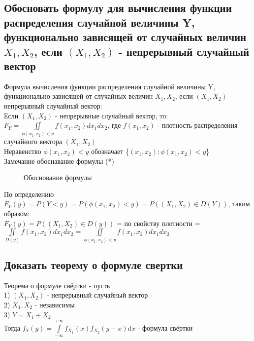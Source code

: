 \subsection{Обосновать формулу для вычисления функции распределения случайной величины Y, функционально зависящей от случайных величин $X_{1}, X_{2}$, если $(X_{1}, X_{2})$ - непрерывный случайный вектор}
Формула вычисления функции распределения случайной величины Y, функционально зависящей от случайных величин $X_{1}, X_{2}$, если $(X_{1}, X_{2})$ - непрерывный случайный вектор:\\
Если $(X_{1}, X_{2})$ - непрерывные случайный вектор, то:\\
$F_{Y} = \iint\limits_{\phi(x_{1}, x_{2}) < y} f(x_{1}, x_{2}) dx_{1} dx_{2}$, где $f(x_{1}, x_{2})$ - плотность распределения случайного вектора $(X_{1}, X_{2})$\\
Неравенство $\phi(x_{1}, x_{2}) < y$ обозначает \{$(x_{1}, x_{2}) : \phi(x_{1}, x_{2}) < y$\}\\

Замечание обоснавание формулы (*)\\
\begin{figure}[H]
	\caption{Обоснование формулы}
\end{figure}

По определению $F_{Y}(y) = P(Y < y) = P(\phi(x_{1}, x_{2}) < y) = P((X_{1}, X_{2}) \in D(Y))$, таким образом:\\
$F_{Y}(y) = P((X_{1}, X_{2}) \in D(y))$ = по свойству плотности = $\iint\limits_{D(y)} f(x_{1}, x_{2}) dx_{1} dx_{2} = \iint\limits_{\phi(x_{1}, x_{2}) < y}f(x_{1}, x_{2}) dx_{1} dx_{2}$\\

\subsection{Доказать теорему о формуле свертки}
Теорема о формуле свёртки - пусть\\
1) $(X_{1}, X_{2})$ - непрерывный случайный вектор\\
2) $X_{1}, X_{2}$ - независимы\\
3) $Y = X_{1} + X_{2}$\\

Тогда $f_{Y}(y) = \int\limits_{-\infty}^{+\infty} f_{X_{1}}(x) f_{X_2}(y - x) dx$ - формула свёртки\\

